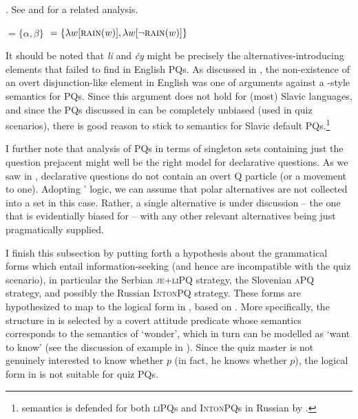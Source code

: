 \documentclass[output=paper,colorlinks,citecolor=brown]{langscibook}
\begin{document}
\citep{Rudin.etal1997,Izvorski.etal1997}. See \citet{Han.Romero2004} and \citet{Dimitrova2020} for a related analysis.

\ea\ea{}${}=\{\alpha,\beta\}$\label{sim:denot:li-cy}
\ex{}${}=\{\lambda w[\textsc{rain}(w)],\lambda w[\neg\textsc{rain}(w)]\}$\label{sim:denot:li-cy-q}
\z\z

\noindent It should be noted that \textit{li} and \textit{čy} might be precisely the alternatives-introduc\-ing elements that \citet{Biezma.Rawlins2012} failed to find in English PQs. As discussed in , the non-existence of an overt disjunction-like element in English was one of   arguments against a \citeauthor{Hamblin1973}-style semantics for PQs. Since this argument does not hold for (most) Slavic languages, and since the PQs discussed in  can be completely unbiased (used in quiz scenarios), there is good reason to stick to  semantics for Slavic default PQs.\footnote{ semantics is defended for both \textsc{liPQ}s and \textsc{IntonPQ}s in Russian by \citet{Zimmerling2023}.}

I further note that  analysis of PQs in terms of singleton sets containing just the question prejacent might well be the right model for declarative questions. As we saw in , declarative questions do not contain an overt Q particle (or a movement to one). Adopting \citeauthor{Biezma.Rawlins2012}' logic, we can assume that polar alternatives are not collected into a set in this case. Rather, a single alternative is under discussion -- the one that is evidentially biased for -- with any other relevant alternatives being just pragmatically supplied.

I finish this subsection by putting forth a hypothesis about the grammatical forms which entail information-seeking (and hence are incompatible with the quiz scenario), in particular the Serbian \textsc{je+liPQ} strategy, the Slovenian \textsc{aPQ} strategy, and possibly the Russian \textsc{IntonPQ} strategy. These forms are hypothesized to map to the logical form in , based on . More specifically, the structure in  is selected by a covert attitude predicate whose semantics corresponds to the semantics of `wonder', which in turn can be modelled as `want to know' (see the discussion of example  in ). Since the quiz master is not genuinely interested to know whether $p$ (in fact, he knows whether $p$), the logical form in  is not suitable for quiz PQs.
\end{document}
